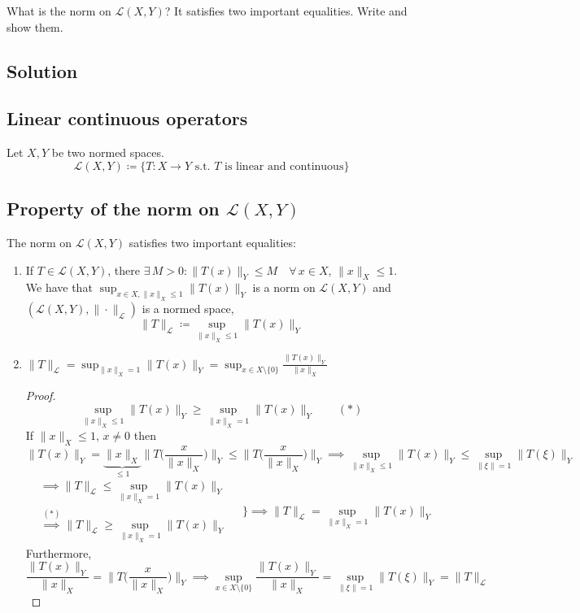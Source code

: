 \sheet


\question
What is the norm on $\mathcal{L}(X,Y)$? It satisfies two important equalities. Write and show them.

\subsection*{Solution}

\subsection{Linear continuous operators}
Let $X,Y$ be two normed spaces.
\[\mathcal{L}(X,Y)\coloneqq\{T:X\rightarrow Y \mbox{ s.t. $T$ is linear and continuous}\}\]

\subsection{Property of the norm on \texorpdfstring{$\mathcal{L}(X,Y)$}{the space of linear continuous operators}}
The norm on $\mathcal{L}(X,Y)$ satisfies two important equalities:
\begin{enumerate}
    \item If $T\in\mathcal{L}(X,Y)$, there $\exists\,M>0:\|T(x)\|_Y\leq M\quad\forall\,x\in X,\,\|x\|_X\leq 1$. \\[4pt]
    We have that $\displaystyle \sup_{x\in X,\|x\|_X\leq1}\|T(x)\|_Y$ is a norm on $\mathcal{L}(X,Y)$ and $(\mathcal{L}(X,Y),\|\cdot\|_{\mathcal{L}})$ is a normed space, 
    \[\|T\|_\mathcal{L}\coloneqq\sup_{\|x\|_X\leq1}\|T(x)\|_Y\]
    \item $\displaystyle\|T\|_\mathcal{L}=\sup_{\|x\|_X =1}\|T(x)\|_Y=\sup_{x\in X\setminus\{0\}}\frac{\|T(x)\|_Y}{\|x\|_X}$
    \begin{proof}
        \[\sup_{\|x\|_X\leq1}\|T(x)\|_Y\geq\sup_{\|x\|_X=1}\|T(x)\|_Y\qquad (*)\]
        If $\|x\|_X\leq1$, $x\ne0$ then
        \[\|T(x)\|_Y=\underbrace{\|x\|_X}_{\leq1}\bigg\|T\bigg(\frac{x}{\|x\|_X}\bigg)\bigg\|_Y\leq\bigg\|T\bigg(\frac{x}{\|x\|_X}\bigg)\bigg\|_Y\implies \sup_{\|x\|_X\leq1}\|T(x)\|_Y\leq\sup_{\|\xi\|=1}\|T(\xi)\|_Y\]
        \[\begin{aligned}
        &\implies \|T\|_\mathcal{L}\leq\sup_{\|x\|_X=1}\|T(x)\|_Y\\
        &\overset{(*)}{\implies} \|T\|_\mathcal{L}\geq\sup_{\|x\|_X=1}\|T(x)\|_Y
        \end{aligned}\quad\Bigg\rbrace \implies\|T\|_\mathcal{L}=\sup_{\|x\|_X=1}\|T(x)\|_Y\]
        Furthermore, 
        \[\frac{\|T(x)\|_Y}{\|x\|_X}=\bigg\|T\bigg(\frac{x}{\|x\|_X}\bigg)\bigg\|_Y\implies\sup_{x\in X\setminus\{0\}}\frac{\|T(x)\|_Y}{\|x\|_X}=\sup_{\|\xi\|=1}\|T(\xi)\|_Y=\| T\|_\mathcal{L}\]
    \end{proof}
\end{enumerate}

